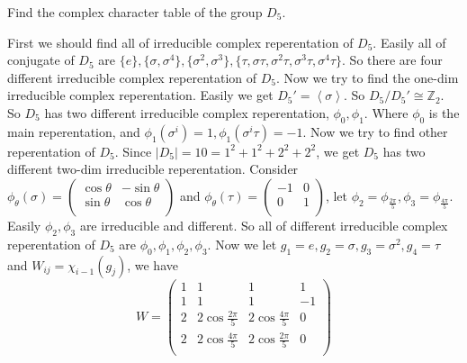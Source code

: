 \documentclass{ctexart}
\begin{document}
\begin{problem}
Find the complex character table of the group \(D_5\).
\end{problem}

\begin{solution}
	First we should find all of irreducible complex reperentation of \(D_5\).
	Easily all of conjugate of \(D_5\) are \(\{ e\},\{ \sigma,\sigma^4\}, \{ \sigma^2,\sigma^3\},\{ \tau,\sigma \tau,\sigma^2 \tau,\sigma^3 \tau,\sigma^4 \tau\}\).
	So there are four different irreducible complex reperentation of \(D_5\).
	Now we try to find the one-dim irreducible complex reperentation. Easily we get \(D_5' = \left\langle  \sigma\right\rangle \).
	So \(D_5 / D_5' \cong \mathbb{Z}_2\). So \(D_5\) has two different irreducible complex reperentation, \(\phi_0,\phi_1\).
	Where \(\phi_0\) is the main reperentation, and \(\phi_1( \sigma^i )=1,\phi_1( \sigma^i \tau)=-1\).
	Now we try to find other reperentation of \(D_5\). Since \(| D_5|=10=1^2+1^2+2^2+2^2\), we get \(D_5\) has two different two-dim irreducible reperentation.
	Consider \(\phi_\theta( \sigma)=\begin{pmatrix}
		\cos \theta & -\sin \theta \\
		\sin \theta & \cos \theta  \\
	\end{pmatrix}\) and \(\phi_\theta( \tau)=\begin{pmatrix}
		-1 & 0 \\
		0  & 1 \\
	\end{pmatrix}\), let \(\phi_2=\phi_{\frac{2 \pi}{5}},\phi_3=\phi_{\frac{4 \pi}{5}}\). Easily \(\phi_2,\phi_3\) are irreducible and different.
	So all of different irreducible complex reperentation of \(D_5\) are \(\phi_0,\phi_1,\phi_2,\phi_3\).
	Now we let \(g_1=e,g_2=\sigma,g_3=\sigma^2,g_4=\tau\) and \(W_{ij}=\chi_{i-1}( g_j)\), we have
	\[
		W=\begin{pmatrix}
			1 & 1                      & 1                      & 1  \\
			1 & 1                      & 1                      & -1 \\
			2 & 2\cos \frac{2 \pi}{5}  & 2 \cos \frac{4 \pi}{5} & 0  \\
			2 & 2 \cos \frac{4 \pi}{5} & 2\cos \frac{2 \pi}{5}  & 0  \\
		\end{pmatrix}
	\]
\end{solution}
\end{document}
